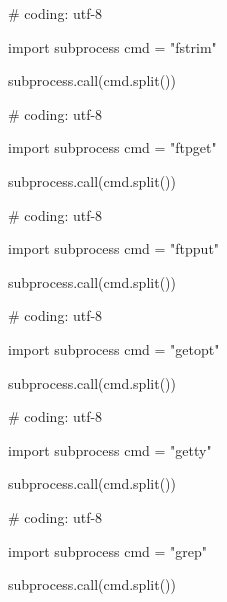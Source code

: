 \begin{mylisting}[label={lst:acpid},language=sh,caption=fstrim]

# coding: utf-8

import subprocess
cmd = "fstrim"

subprocess.call(cmd.split())

\end{mylisting}

\begin{mylisting}[label={lst:acpid},language=sh,caption=ftpget]

# coding: utf-8

import subprocess
cmd = "ftpget"

subprocess.call(cmd.split())

\end{mylisting}

\begin{mylisting}[label={lst:acpid},language=sh,caption=ftpput]

# coding: utf-8

import subprocess
cmd = "ftpput"

subprocess.call(cmd.split())

\end{mylisting}

\begin{mylisting}[label={lst:acpid},language=sh,caption=getopt]

# coding: utf-8

import subprocess
cmd = "getopt"

subprocess.call(cmd.split())

\end{mylisting}

\begin{mylisting}[label={lst:acpid},language=sh,caption=getty]

# coding: utf-8

import subprocess
cmd = "getty"

subprocess.call(cmd.split())

\end{mylisting}

\begin{mylisting}[label={lst:acpid},language=sh,caption=grep]

# coding: utf-8

import subprocess
cmd = "grep"

subprocess.call(cmd.split())

\end{mylisting}

